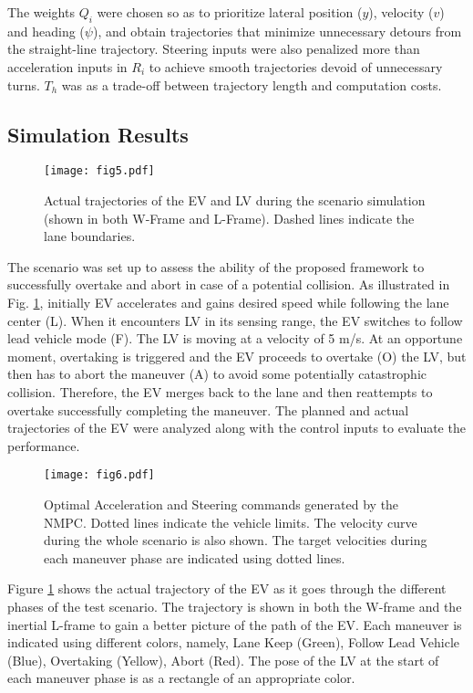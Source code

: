 \documentclass[letterpaper, 10 pt, conference]{ieeeconf}
\begin{document}
The weights $Q_{i}$ were chosen so as to prioritize lateral position ($y$), velocity ($v$) and heading ($\psi$), and obtain trajectories that minimize unnecessary detours from the straight-line trajectory. Steering inputs were also penalized more than acceleration inputs in $R_{i}$ to achieve smooth trajectories devoid of unnecessary turns. $T_h$ was as a trade-off between trajectory length and computation costs.  

\subsection{Simulation Results}

\begin{figure}[!t]
  \centering
  \texttt{[image: fig5.pdf]}
  \caption{Actual trajectories of the EV and LV during the scenario simulation (shown in both W-Frame and L-Frame). Dashed lines indicate the lane boundaries.}
  \label{fig:topview}
\end{figure}

The scenario was set up to assess the ability of the proposed framework to successfully overtake and abort in case of a potential collision. 
As illustrated in Fig. \ref{fig:topview}, initially EV accelerates and gains desired speed while following the lane center (L). When it encounters LV in its sensing range, the EV switches to follow lead vehicle mode (F). The LV is moving at a velocity of 5 m/s. At an opportune moment, overtaking is triggered and the EV proceeds to overtake (O) the LV, but then has to abort the maneuver (A) to avoid some potentially catastrophic collision. Therefore, the EV merges back to the lane and then reattempts to overtake successfully completing the maneuver. The planned and actual trajectories of the EV were analyzed along with the control inputs to evaluate the performance.\

\begin{figure}[!t]
  \centering
  \texttt{[image: fig6.pdf]}
  \caption{Optimal Acceleration and Steering commands generated by the NMPC. Dotted lines indicate the vehicle limits. The velocity curve during the whole scenario is also shown. The target velocities during each maneuver phase are indicated using dotted lines.}
  \label{fig:accsteervel}
\end{figure}

Figure \ref{fig:topview} shows the actual trajectory of the EV as it goes through the different phases of the test scenario. The trajectory is shown in both the W-frame and the inertial L-frame to gain a better picture of the path of the EV. Each maneuver is indicated using different colors, namely, Lane Keep (Green), Follow Lead Vehicle (Blue), Overtaking (Yellow), Abort (Red). The pose of the LV at the start of each maneuver phase is as a rectangle of an appropriate color.\  
\end{document}
